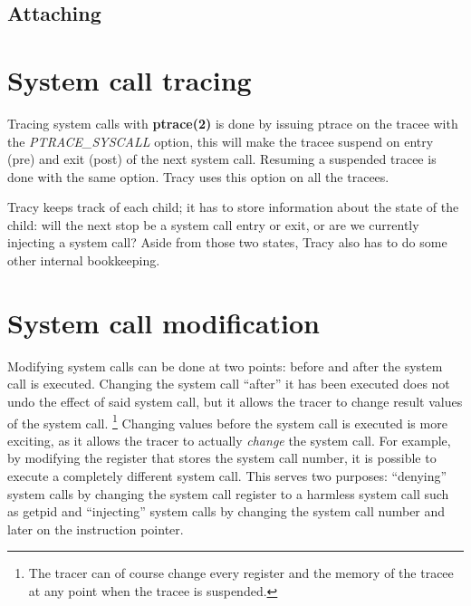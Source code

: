 \documentclass[a4paper, 10pt]{report}
\begin{document}
\subsection{Attaching}

%

\section{System call tracing}

Tracing system calls with \textbf{ptrace(2)} is done by issuing ptrace on the
tracee with the \textit{PTRACE\_SYSCALL} option, this will make the tracee
suspend on entry (pre) and exit (post) of the next system call. Resuming a
suspended tracee is done with the same option. Tracy uses this option on
all the tracees.

Tracy keeps track of each child; it has to store information about the state
of the child: will the next stop be a system call entry or exit, or are we
currently injecting a system call? Aside from those two states, Tracy also
has to do some other internal bookkeeping.


\section{System call modification}

Modifying system calls can be done at two points: before and after the
system call is executed. Changing the system call ``after'' it has been executed
does not undo the effect of said system call, but it allows the tracer to change
result values of the system call.
\footnote{The tracer can of course change every register and the memory of the
tracee at any point when the tracee is suspended.}
Changing values before the system call is executed is more exciting, as it
allows the tracer to actually \textit{change} the system call. For example, by
modifying the register that stores the system call number, it is possible to
execute a completely different system call. This serves two purposes:
``denying'' system calls by changing the system call register to a harmless
system call such as getpid and ``injecting'' system calls by changing the
system call number and later on the instruction pointer.
\end{document}

